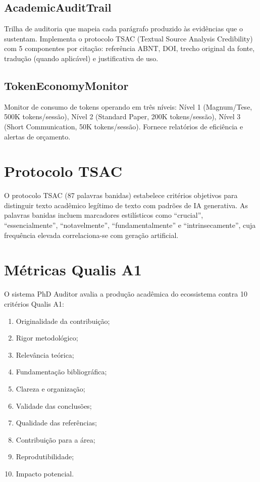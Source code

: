 \documentclass[12pt,a4paper,sumario=tradicional]{abntex2}
\begin{document}
\subsection{AcademicAuditTrail}

Trilha de auditoria que mapeia cada parágrafo produzido às evidências que o sustentam. Implementa o protocolo TSAC (Textual Source Analysis Credibility) com 5 componentes por citação: referência ABNT, DOI, trecho original da fonte, tradução (quando aplicável) e justificativa de uso.

\subsection{TokenEconomyMonitor}

Monitor de consumo de tokens operando em três níveis: Nível 1 (Magnum/Tese, 500K tokens/sessão), Nível 2 (Standard Paper, 200K tokens/sessão), Nível 3 (Short Communication, 50K tokens/sessão). Fornece relatórios de eficiência e alertas de orçamento.

\section{Protocolo TSAC}

O protocolo TSAC (87 palavras banidas) estabelece critérios objetivos para distinguir texto acadêmico legítimo de texto com padrões de IA generativa. As palavras banidas incluem marcadores estilísticos como ``crucial'', ``essencialmente'', ``notavelmente'', ``fundamentalmente'' e ``intrinsecamente'', cuja frequência elevada correlaciona-se com geração artificial.

\section{Métricas Qualis A1}

O sistema PhD Auditor avalia a produção acadêmica do ecossistema contra 10 critérios Qualis A1:

\begin{enumerate}
    \item Originalidade da contribuição;
    \item Rigor metodológico;
    \item Relevância teórica;
    \item Fundamentação bibliográfica;
    \item Clareza e organização;
    \item Validade das conclusões;
    \item Qualidade das referências;
    \item Contribuição para a área;
    \item Reprodutibilidade;
    \item Impacto potencial.
\end{enumerate}
\end{document}
